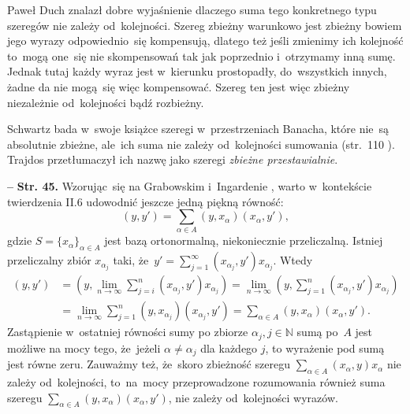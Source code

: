 \documentclass[a4paper,11pt]{article}
\newcommand{\mb}{\mathbb}
\newcommand{\ra}{\rightarrow}
\newcommand{\al}{\alpha}
\newcommand{\N}{\mb{N}}
\newcommand{\Lim}{\lim\limits}
\newcommand{\Sum}{\sum\limits}
\newcommand{\tb}{\textbf}
\newcommand{\noi}{\noindent}
\newcommand{\start}{\noi \tb{--} {}}
\newcommand{\Str}[1]{\tb{Str. #1.}}
\begin{document}
Paweł Duch znalazł dobre wyjaśnienie dlaczego suma tego konkretnego
typu szeregów nie zależy od~kolejności. Szereg zbieżny warunkowo jest
zbieżny bowiem jego wyrazy odpowiednio~się kompensują, dlatego też
jeśli zmienimy ich kolejność to~mogą one~się nie skompensowań tak jak
poprzednio i~otrzymamy inną sumę. Jednak tutaj każdy wyraz jest
w~kierunku prostopadły, %
do~wszystkich innych, żadne da %
nie mogą~się więc kompensować. Szereg ten jest więc zbieżny
niezależnie od~kolejności bądź rozbieżny.

Schwartz bada w~swoje książce szeregi w~przestrzeniach Banacha, które
nie~są absolutnie zbieżne, ale~ich suma nie zależy od~kolejności
sumowania (str.~110 \cite{Sch79}). Trajdos przetłumaczył ich nazwę
jako szeregi \emph{zbieżne przestawialnie}.

\start \Str{45} Wzorując~się na Grabowskim i~Ingardenie
\cite{GrabowskiIngarden87}, warto w~kontekście twierdzenia II.6
udowodnić jeszcze jedną piękną równość:
\begin{displaymath}
  ( y, y' ) = \Sum_{ \al \in A } ( y, x_{ \al } )( x_{ \al }, y' ),
\end{displaymath}
gdzie $S = \{ x_{ \al } \}_{ \al \in A }$ jest bazą ortonormalną,
niekoniecznie przeliczalną. Istniej przeliczalny zbiór
$x_{ \al_{ j } }$ taki,
że~$y' = \Sum_{ j = 1 }^{ \infty } ( x_{ \al_{ j } }, y' ) x_{ \al_{ j
  } }$. Wtedy
\begin{equation*}
  \begin{split}
    ( y, y' ) &= ( y, \Lim_{ n \ra \infty } \Sum_{ j = i }^{ n } ( x_{
      \al_{ j } }, y' ) x_{ \al_{ j } } ) = \Lim_{ n \ra \infty
    } ( y, \Sum_{ j = 1 }^{ n } ( x_{ \al_{ j } }, y' ) x_{ \al_{ j } } ) \\
    &= \Lim_{ n \ra \infty } \Sum_{ j = 1 }^{ n } ( y, x_{ \al_{ j } }
    ) ( x_{ \al_{ j } }, y' ) %
    = \Sum_{ \al \in A } ( y, x_{ \al } )( x_{ \al }, y' ).
  \end{split}
\end{equation*}
Zastąpienie w~ostatniej równości sumy po zbiorze
$\alpha_{ j }, j \in \N$ sumą po~$A$ jest możliwe na mocy tego,
że~jeżeli $\alpha \neq \alpha_{ j }$ dla każdego $j$, to wyrażenie pod
sumą jest równe zeru. Zauważmy też, że~skoro zbieżność szeregu
$\sum_{ \al \in A } ( x_{ \al }, y ) x_{ \al }$ nie zależy
od~kolejności, to~na~mocy przeprowadzone rozumowania również suma
szeregu $\sum_{ \al \in A } ( y, x_{ \al } )( x_{ \al }, y' )$, nie
zależy od~kolejności wyrazów.
\end{document}
